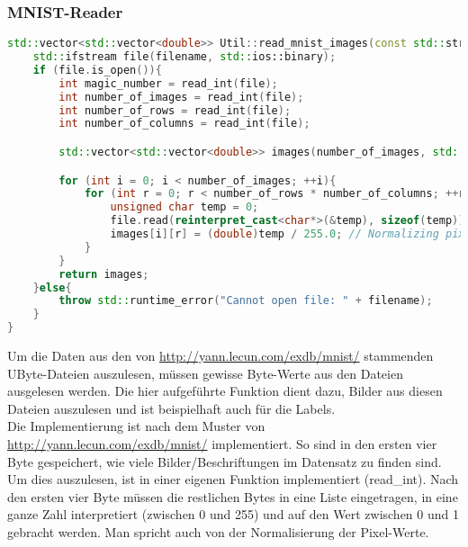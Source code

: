 \subsubsection{MNIST-Reader}
\label{sec:RealMNISTReaderCode}
\begin{lstlisting}[language=C++]
std::vector<std::vector<double>> Util::read_mnist_images(const std::string &filename){
    std::ifstream file(filename, std::ios::binary);
    if (file.is_open()){
        int magic_number = read_int(file);
        int number_of_images = read_int(file);
        int number_of_rows = read_int(file);
        int number_of_columns = read_int(file);

        std::vector<std::vector<double>> images(number_of_images, std::vector<double>(number_of_rows * number_of_columns));

        for (int i = 0; i < number_of_images; ++i){
            for (int r = 0; r < number_of_rows * number_of_columns; ++r){
                unsigned char temp = 0;
                file.read(reinterpret_cast<char*>(&temp), sizeof(temp));
                images[i][r] = (double)temp / 255.0; // Normalizing pixel values to [0, 1]
            }
        }
        return images;
    }else{
        throw std::runtime_error("Cannot open file: " + filename);
    }
}
\end{lstlisting}
Um die Daten aus den von \url{http://yann.lecun.com/exdb/mnist/} stammenden UByte-Dateien auszulesen, müssen gewisse Byte-Werte aus den Dateien ausgelesen werden. Die hier aufgeführte Funktion dient dazu, Bilder aus diesen Dateien auszulesen und ist beispielhaft auch für die Labels.
\\
Die Implementierung ist nach dem Muster von \url{http://yann.lecun.com/exdb/mnist/} implementiert. So sind in den ersten vier Byte gespeichert, wie viele Bilder/Beschriftungen im Datensatz zu finden sind. Um dies auszulesen, ist in einer eigenen Funktion implementiert (read\_int). Nach den ersten vier Byte müssen die restlichen Bytes in eine Liste eingetragen, in eine ganze Zahl interpretiert (zwischen 0 und 255) und auf den Wert zwischen 0 und 1 gebracht werden. Man spricht auch von der Normalisierung der Pixel-Werte.

